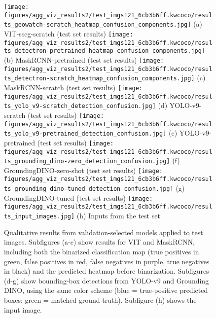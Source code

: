 \begin{figure*}[ht]
\centering
\texttt{[image: figures/agg\_viz\_results2/test\_imgs121\_6cb3b6ff.kwcoco/results\_geowatch-scratch\_heatmap\_confusion\_components.jpg]}%
\hfill
(a) VIT-sseg-scratch (test set results)
\texttt{[image: figures/agg\_viz\_results2/test\_imgs121\_6cb3b6ff.kwcoco/results\_detectron-pretrained\_heatmap\_confusion\_components.jpg]}%
\hfill
(b) MaskRCNN-pretrained (test set results)
\texttt{[image: figures/agg\_viz\_results2/test\_imgs121\_6cb3b6ff.kwcoco/results\_detectron-scratch\_heatmap\_confusion\_components.jpg]}%
\hfill
(c) MaskRCNN-scratch (test set results)
\texttt{[image: figures/agg\_viz\_results2/test\_imgs121\_6cb3b6ff.kwcoco/results\_yolo\_v9-scratch\_detection\_confusion.jpg]}%
\hfill
(d) YOLO-v9-scratch (test set results)
\texttt{[image: figures/agg\_viz\_results2/test\_imgs121\_6cb3b6ff.kwcoco/results\_yolo\_v9-pretrained\_detection\_confusion.jpg]}%
\hfill
(e) YOLO-v9-pretrained (test set results)
\texttt{[image: figures/agg\_viz\_results2/test\_imgs121\_6cb3b6ff.kwcoco/results\_grounding\_dino-zero\_detection\_confusion.jpg]}%
\hfill
(f) GroundingDINO-zero-shot (test set results)
\texttt{[image: figures/agg\_viz\_results2/test\_imgs121\_6cb3b6ff.kwcoco/results\_grounding\_dino-tuned\_detection\_confusion.jpg]}%
\hfill
(g) GroundingDINO-tuned (test set results)
\texttt{[image: figures/agg\_viz\_results2/test\_imgs121\_6cb3b6ff.kwcoco/results\_input\_images.jpg]}%
\hfill
(h) Inputs from the test set
\caption[]{
    Qualitative results from validation-selected models applied to test images.
    Subfigures (a-c) show results for VIT and MaskRCNN, including both the binarized classification map
    (\textcolor{tptrue}{true positives in green}, 
     \textcolor{fpred}{false positives in red}, 
     \textcolor{fntrue}{false negatives in purple}, 
     \textcolor{neutral}{true negatives in black}) 
    and the predicted heatmap before binarization.  
    Subfigures (d-g) show bounding-box detections from YOLO-v9 and Grounding DINO, using the same color scheme 
    (\textcolor{tppred}{blue = true-positive predicted boxes}; 
     \textcolor{tptrue}{green = matched ground truth}).
    Subfigure (h) shows the input image.
}
\label{fig:test_results_all_models}
\end{figure*}


